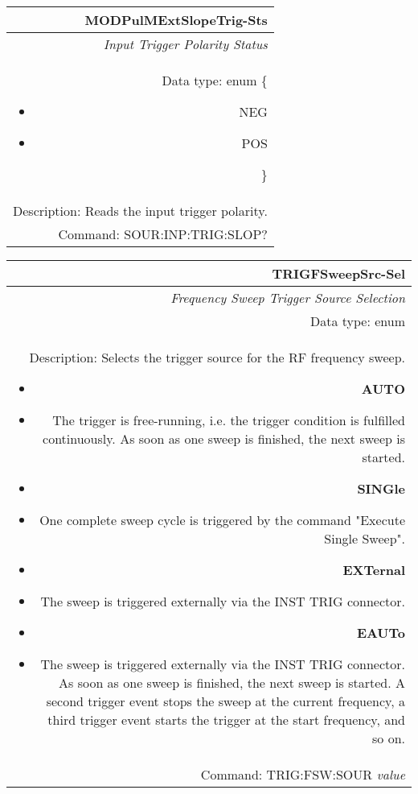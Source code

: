 \documentclass[openany]{article}
\begin{document}
		\begin{tabular}{N}
			\hline
			\bfseries MODPulMExtSlopeTrig-Sts \\ \hline
			\emph{Input Trigger Polarity Status} \\
			Data type: enum \{\begin{itemize}[noitemsep]
				\small
				\item[] NEG
				\item[] POS
			\end{itemize}\} \\ 
			Description: Reads the input trigger polarity. \\
			Command: SOUR:INP:TRIG:SLOP? \\

		\end{tabular}
%
		\begin{tabular}{N}
			\hline
			\bfseries TRIGFSweepSrc-Sel \\ \hline
			\emph{Frequency Sweep Trigger Source Selection} \\
			Data type: enum \\   
			Description: Selects the trigger source for the RF frequency sweep.\begin{itemize}[noitemsep]
				\small
				\item[] \textbf{AUTO}
				\item[] The trigger is free-running, i.e. the trigger condition is fulfilled continuously. As soon as one sweep is finished, the next sweep is started.
                                \item[] \textbf{SINGle}
				\item[] One complete sweep cycle is triggered by the command "Execute Single Sweep".
				\item[] \textbf{EXTernal}
				\item[] The sweep is triggered externally via the INST TRIG connector.
                                \item[] \textbf{EAUTo}
				\item[] The sweep is triggered externally via the INST TRIG connector. As soon as one sweep is finished, the next sweep is started. A second trigger event stops the sweep at the current frequency, a third trigger event starts the trigger at the start frequency, and so on.

			\end{itemize} \\
			Command: TRIG:FSW:SOUR \emph{value} \\

		\end{tabular}
\end{document}
